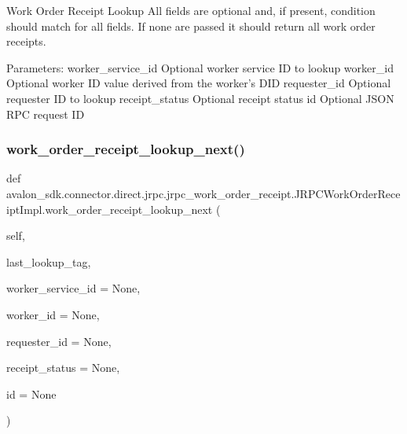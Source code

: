 \begin{DoxyVerb}Work Order Receipt Lookup
All fields are optional and, if present, condition should match for
all fields. If none are passed it should return all
work order receipts.

Parameters:
worker_service_id        Optional worker service ID to lookup
worker_id                Optional worker ID value derived from
                 the worker's DID
requester_id             Optional requester ID to lookup
receipt_status           Optional receipt status
id                       Optional JSON RPC request ID
\end{DoxyVerb}
 \mbox{\label{classavalon__sdk_1_1connector_1_1direct_1_1jrpc_1_1jrpc__work__order__receipt_1_1JRPCWorkOrderReceiptImpl_a5aea6a56cf260bd4d0d12d8d55cd5212}} 
\subsubsection{\texorpdfstring{work\+\_\+order\+\_\+receipt\+\_\+lookup\+\_\+next()}{work\_order\_receipt\_lookup\_next()}}
{\footnotesize\ttfamily def avalon\+\_\+sdk.\+connector.\+direct.\+jrpc.\+jrpc\+\_\+work\+\_\+order\+\_\+receipt.\+J\+R\+P\+C\+Work\+Order\+Receipt\+Impl.\+work\+\_\+order\+\_\+receipt\+\_\+lookup\+\_\+next (\begin{DoxyParamCaption}\item[{}]{self,  }\item[{}]{last\+\_\+lookup\+\_\+tag,  }\item[{}]{worker\+\_\+service\+\_\+id = {\ttfamily None},  }\item[{}]{worker\+\_\+id = {\ttfamily None},  }\item[{}]{requester\+\_\+id = {\ttfamily None},  }\item[{}]{receipt\+\_\+status = {\ttfamily None},  }\item[{}]{id = {\ttfamily None} }\end{DoxyParamCaption})}

